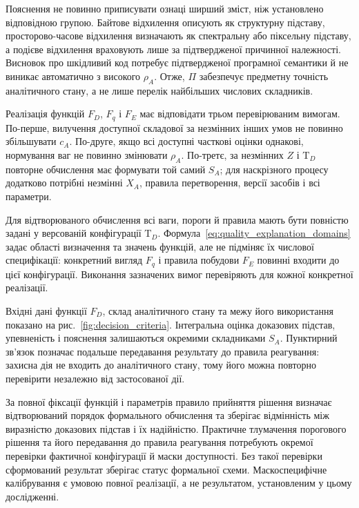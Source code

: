 Пояснення не повинно приписувати ознаці ширший зміст, ніж установлено відповідною групою. Байтове відхилення описують як структурну підставу, просторово-часове відхилення визначають як спектральну або піксельну підставу, а подієве відхилення враховують лише за підтвердженої причинної належності. Висновок про шкідливий код потребує підтвердженої програмної семантики й не виникає автоматично з високого $\rho_A$. Отже, $\Pi$ забезпечує предметну точність аналітичного стану, а не лише перелік найбільших числових складників.

Реалізація функцій $F_D$, $F_q$ і $F_E$ має відповідати трьом перевірюваним вимогам. По-перше, вилучення доступної складової за незмінних інших умов не повинно збільшувати $c_A$. По-друге, якщо всі доступні часткові оцінки однакові, нормування ваг не повинно змінювати $\rho_A$. По-третє, за незмінних $Z$ і $\mathrm T_D$ повторне обчислення має формувати той самий $S_A$; для наскрізного процесу додатково потрібні незмінні $X_A$, правила перетворення, версії засобів і всі параметри.

Для відтворюваного обчислення всі ваги, пороги й правила мають бути повністю задані у версованій конфігурації $\mathrm T_D$. Формула~\eqref{eq:quality_explanation_domains} задає області визначення та значень функцій, але не підміняє їх числової специфікації: конкретний вигляд $F_q$ і правила побудови $F_E$ повинні входити до цієї конфігурації. Виконання зазначених вимог перевіряють для кожної конкретної реалізації.

Вхідні дані функції $F_D$, склад аналітичного стану та межу його використання показано на рис.~\ref{fig:decision_criteria}. Інтегральна оцінка доказових підстав, упевненість і пояснення залишаються окремими складниками $S_A$. Пунктирний зв’язок позначає подальше передавання результату до правила реагування: захисна дія не входить до аналітичного стану, тому його можна повторно перевірити незалежно від застосованої дії.



За повної фіксації функцій і параметрів правило прийняття рішення визначає відтворюваний порядок формального обчислення та зберігає відмінність між виразністю доказових підстав і їх надійністю. Практичне тлумачення порогового рішення та його передавання до правила реагування потребують окремої перевірки фактичної конфігурації й маски доступності. Без такої перевірки сформований результат зберігає статус формальної схеми. Маскоспецифічне калібрування є умовою повної реалізації, а не результатом, установленим у цьому дослідженні.

